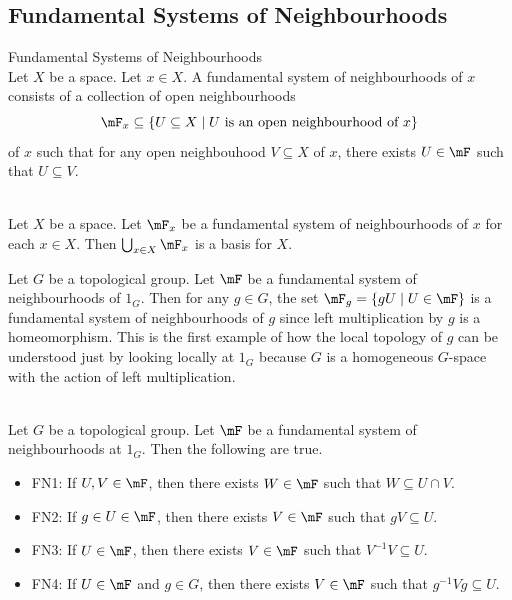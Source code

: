 \documentclass[a4paper]{article}
\begin{document}
\subsection{Fundamental Systems of Neighbourhoods}
\begin{defn}{Fundamental Systems of Neighbourhoods}{}\\
Let $X$ be a space. Let $x\in X$. A fundamental system of neighbourhoods of $x$ consists of a collection of open neighbourhoods $$\mF_x\subseteq\{U\subseteq X\;|\;U\text{ is an open neighbourhood of }x\}$$ of $x$ such that for any open neighbouhood $V\subseteq X$ of $x$, there exists $U\in\mF$ such that $U\subseteq V$. 
\end{defn}

\begin{lmm}{}{}\\
Let $X$ be a space. Let $\mF_x$ be a fundamental system of neighbourhoods of $x$ for each $x\in X$. Then $\bigcup_{x\in X}\mF_x$ is a basis for $X$. 
\end{lmm}

Let $G$ be a topological group. Let $\mF$ be a fundamental system of neighbourhoods of $1_G$. Then for any $g\in G$, the set $\mF_g=\{gU\;|\;U\in\mF\}$ is a fundamental system of neighbourhoods of $g$ since left multiplication by $g$ is a homeomorphism. This is the first example of how the local topology of $g$ can be understood just by looking locally at $1_G$ because $G$ is a homogeneous $G$-space with the action of left multiplication. 

\begin{prp}{}{}\\
Let $G$ be a topological group. Let $\mF$ be a fundamental system of neighbourhoods at $1_G$. Then the following are true. 
\begin{itemize}
\item FN1: If $U,V\in\mF$, then there exists $W\in\mF$ such that $W\subseteq U\cap V$. 
\item FN2: If $g\in U\in\mF$, then there exists $V\in\mF$ such that $gV\subseteq U$. 
\item FN3: If $U\in\mF$, then there exists $V\in\mF$ such that $V^{-1}V\subseteq U$. 
\item FN4: If $U\in\mF$ and $g\in G$, then there exists $V\in\mF$ such that $g^{-1}Vg\subseteq U$. 
\end{itemize}
\end{prp}
\end{document}
